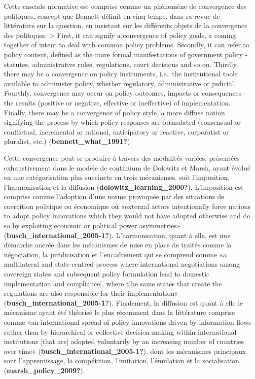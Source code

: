 \documentclass[12pt]{ulaval}
\begin{document}
Cette cascade normative est comprise comme un phénomène de convergence des politiques, concept que Bennett définit en cinq temps, dans sa revue de littérature sur la question, en insistant sur les différents objets de la convergence des politiques:
\textgreater{} First, it can signify a convergence of policy goals, a coming together of intent to deal with common policy problems. Secondly, it can refer to policy content, defined as the more formal manifestations of government policy - statutes, administrative rules, regulations, court decisions and so on. Thirdly, there may be a convergence on policy instruments, i.e.~the institutional tools available to administer policy, whether regulatory, administrative or judicial. Fourthly, convergence may occur on policy outcomes, impacts or consequences - the results (positive or negative, effective or ineffective) of implementation. Finally, there may be a convergence of policy style, a more diffuse notion signifying the process by which policy responses are formulated (consensual or conflictual, incremental or rational, anticipatory or reactive, corporatist or pluralist, etc.) (\textbf{bennett\_what\_1991?}).

Cette convergence peut se produire à travers des modalités variées, présentées exhaustivement dans le modèle de continuum de Dolowitz et Marsh, ayant évolué en une catégorisation plus succincte en trois mécanismes, soit l'imposition, l'harmonisation et la diffusion (\textbf{dolowitz\_learning\_2000?}). L'imposition est comprise comme l'adoption d'une norme provoquée par des situations de coercition politique ou économique où «external actors intentionally force nations to adopt policy innovations which they would not have adopted otherwise and do so by exploiting economic or political power asymmetries» (\textbf{busch\_international\_2005-1?}). L'harmonisation, quant à elle, est une démarche ancrée dans les mécanismes de mise en place de traités comme la négociation, la juridicisation et l'encadrement qui se comprend comme «a multilateral and state-centred process where international negotiations among sovereign states and subsequent policy formulation lead to domestic implementation and compliance{[}, where t{]}he same states that create the regulations are also responsible for their implementation» (\textbf{busch\_international\_2005-1?}). Finalement, la diffusion est quant à elle le mécanisme ayant été théorisé le plus récemment dans la littérature comprise comme «an international spread of policy innovations driven by information flows rather than by hierarchical or collective decision-making within international institutions {[}that are{]} adopted voluntarily by an increasing number of countries over time» (\textbf{busch\_international\_2005-1?}), dont les mécanismes principaux sont l'apprentissage, la compétition, l'imitation, l'émulation et la socialisation (\textbf{marsh\_policy\_2009?}).
\end{document}
